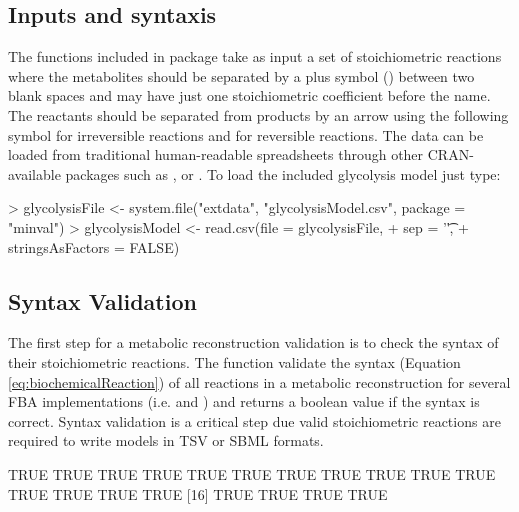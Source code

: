 \subsection{Inputs and syntaxis}
The functions included in  package take as input a set of stoichiometric reactions where the metabolites should be separated by a plus symbol (\code{+}) between two blank spaces and may have just one stoichiometric coefficient before the name. The reactants should be separated from products by an arrow using the following symbol \code{=>} for irreversible reactions and \code{<=>} for reversible reactions.
The data can be loaded from traditional human-readable spreadsheets through other CRAN-available packages such as ,  or . To load the included glycolysis model just type:
\begin{Schunk}
\begin{Sinput}
> glycolysisFile <- system.file("extdata", "glycolysisModel.csv", package = "minval")
> glycolysisModel <- read.csv(file = glycolysisFile, 
+                             sep = '\t',
+                             stringsAsFactors = FALSE)
\end{Sinput}
\end{Schunk}

\subsection{Syntax Validation}
The first step for a metabolic reconstruction validation is to check the syntax of their stoichiometric reactions. The  function validate the syntax (Equation \ref{eq:biochemicalReaction}) of all reactions in a metabolic reconstruction for several FBA implementations (i.e.  and ) and returns a boolean value  if the syntax is correct. Syntax validation is a critical step due valid stoichiometric reactions are required to write models in TSV or SBML formats.
\begin{Schunk}
\begin{Soutput}
 [1] TRUE TRUE TRUE TRUE TRUE TRUE TRUE TRUE TRUE TRUE TRUE TRUE TRUE TRUE TRUE
[16] TRUE TRUE TRUE TRUE
\end{Soutput}
\end{Schunk}
